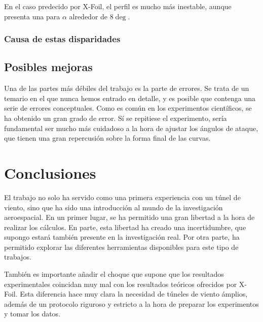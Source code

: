 \documentclass{article}
\begin{document}
En el caso predecido por X-Foil, el perfil es mucho más inestable, aunque presenta una 
para $\alpha$ alrededor de $8\deg$.

\subsubsection{Causa de estas disparidades}



\subsection{Posibles mejoras}

Una de las partes más débiles del trabajo es la parte de errores. Se trata de un temario en el que nunca hemos entrado 
en detalle, y es posible que contenga una serie de errores conceptuales. Como es común en los experimentos científicos, se ha
obtenido un gran grado de error. Sí se repitiese el experimento, sería fundamental ser mucho más cuidadoso a la hora de ajustar 
los ángulos de ataque, que tienen una gran repercusión sobre la forma final de las curvas. 



\section{Conclusiones}

El trabajo no solo ha servido como una primera experiencia con un túnel de viento, sino que ha sido una introducción al mundo
de la investigación aeroespacial. En un primer lugar, se ha permitido una gran libertad a la hora de realizar los cálculos. 
En parte, esta libertad ha creado una incertidumbre, que supongo estará también presente en la investigación real. Por otra parte,
ha permitido explorar las diferentes herramientas disponibles para este tipo de trabajos. 

También es importante añadir el choque que supone que los resultados experimentales coincidan muy mal con los resultados 
teóricos ofrecidos por X-Foil. Esta diferencia hace muy clara la necesidad de túneles de viento ámplios, 
además de un protocolo riguroso y estricto a la hora de preparar los experimentos y tomar los datos.

\printbibliography
\end{document}
